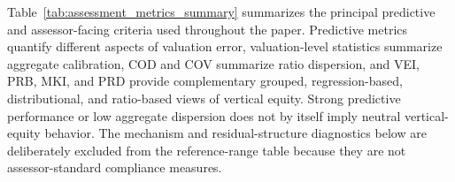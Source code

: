 \documentclass[10pt]{article}
\theoremstyle{definition}
\newcommand{\1}{\mathbf{1}}
\newcommand{\newtext}[1]{\textcolor{impGreen}{#1}}
\begin{document}


{Table~\ref{tab:assessment_metrics_summary} summarizes the principal predictive and assessor-facing criteria used throughout the paper. Predictive metrics quantify different aspects of valuation error, valuation-level statistics summarize aggregate calibration, COD and COV summarize ratio dispersion, and VEI, PRB, MKI, and PRD provide complementary grouped, regression-based, distributional, and ratio-based views of vertical equity. Strong predictive performance or low aggregate dispersion does not by itself imply neutral vertical-equity behavior.}
\newtext{The mechanism and residual-structure diagnostics below are deliberately excluded from the reference-range table because they are not assessor-standard compliance measures.}
\end{document}
